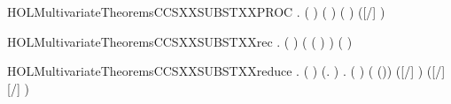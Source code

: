\newcommand{\HOLMultivariateTheoremsCCSXXSUBSTXXprefix}{\UseVerbatim{HOLMultivariateTheoremsCCSXXSUBSTXXprefix}}
\begin{SaveVerbatim}{HOLMultivariateTheoremsCCSXXSUBSTXXPROC}
\HOLTokenTurnstile{} \HOLSymConst{\HOLTokenForall{}}  .
       (  \HOLSymConst{=}  ) \HOLSymConst{\HOLTokenConj{}}  ( ) ( ) \HOLSymConst{\HOLTokenConj{}}
         \HOLSymConst{\HOLTokenImp{}}
       ([/]  \HOLSymConst{=} )
\end{SaveVerbatim}
\newcommand{\HOLMultivariateTheoremsCCSXXSUBSTXXPROC}{\UseVerbatim{HOLMultivariateTheoremsCCSXXSUBSTXXPROC}}
\begin{SaveVerbatim}{HOLMultivariateTheoremsCCSXXSUBSTXXrec}
\HOLTokenTurnstile{} \HOLSymConst{\HOLTokenForall{}}  .
         (  ) \HOLSymConst{=}
         \HOLConst{\HOLTokenIn{}}      ( ( \HOLSymConst{\ensuremath{\setminus}} ) )
          (  )
\end{SaveVerbatim}
\newcommand{\HOLMultivariateTheoremsCCSXXSUBSTXXrec}{\UseVerbatim{HOLMultivariateTheoremsCCSXXSUBSTXXrec}}
\begin{SaveVerbatim}{HOLMultivariateTheoremsCCSXXSUBSTXXreduce}
\HOLTokenTurnstile{} \HOLSymConst{\HOLTokenForall{}}   .
       \HOLSymConst{\HOLTokenNeg{}}   \HOLSymConst{\HOLTokenConj{}}   \HOLSymConst{\HOLTokenConj{}} (  \HOLSymConst{=}  ) \HOLSymConst{\HOLTokenConj{}}
        (\HOLTokenLambda{}.  \HOLConst{\HOLTokenNotIn{}}  )  \HOLSymConst{\HOLTokenImp{}}
       \HOLSymConst{\HOLTokenForall{}} .
            ( ) ( (\HOLSymConst{::})) \HOLSymConst{\HOLTokenConj{}} ([/]  \HOLSymConst{=} ) \HOLSymConst{\HOLTokenImp{}}
           ([\HOLSymConst{::}/\HOLSymConst{::}]  \HOLSymConst{=} [/] )
\end{SaveVerbatim}
